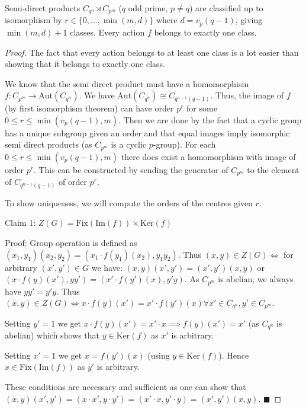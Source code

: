 \begin{theorem}\label{Classification of semi-direct products between Cyclic p-group and q-groups}
    Semi-direct products $C_{q^n} \rtimes C_{p^m}$ ($q$ odd prime, $p \neq q$) are classified up to isomorphism by $r \in \{0, …, \min(m, d)\}$ where $d = v_p(q - 1)$, giving $\min(m, d) + 1$ classes. Every action $f$ belongs to exactly one class.
\end{theorem}
\begin{proof}
    The fact that every action belongs to at least one class is a lot easier than showing that it belongs to exactly one class.

    We know that the semi direct product must have a homomorphism $f : C_{p^m} \rightarrow \text{Aut}(C_{q^n})$. We have $\text{Aut}(C_{q^n}) \cong C_{q^{n-1}(q - 1)}$. Thus, the image of $f$ (by first isomorphism theorem) can have order $p^r$ for some $0 \leq r \leq \min(v_p(q-1), m)$. Then we are done by the fact that a cyclic group has a unique subgroup given an order and that equal images imply isomorphic semi direct products (as $C_{p^m}$ is a cyclic $p$-group). For each $0 \leq r \leq \min(v_p(q-1), m)$ there does exist a homomorphism with image of order $p^r$. This can be constructed by sending the generator of $C_{p^m}$ to the element of $C_{q^{n-1}(q-1)}$ of order $p^r$.

    To show uniqueness, we will compute the orders of the centres given $r$.

    Claim 1: $Z(G) = \text{Fix}(\text{Im}(f)) \times \text{Ker}(f)$

    Proof: Group operation is defined as $(x_1, y_1)(x_2, y_2) = (x_1 \cdot f(y_1)(x_2), y_1y_2)$. Thus $(x, y) \in Z(G) \iff$ for arbitrary $(x', y') \in G$ we have: $(x, y)(x', y') = (x', y')(x, y)$ or $(x \cdot f(y)(x'), yy') = (x' \cdot f(y')(x), y'y)$. As $C_{p^m}$ is abelian, we always have $yy' = y'y$. Thus $(x, y) \in Z(G) \iff x \cdot f(y)(x') = x' \cdot f(y')(x) \forall x' \in C_{q^n}, y' \in C_{p^m}$. 
    
    Setting $y' = 1$ we get $x \cdot f(y)(x') = x' \cdot x \implies f(y)(x') = x'$ (as $C_{q^n}$ is abelian) which shows that $y \in \text{Ker}(f)$ as $x'$ is arbitrary.

    Setting $x' = 1$ we get $x = f(y')(x)$ (using $y \in \text{Ker}(f)$). Hence $x \in \text{Fix}(\text{Im}(f))$ as $y'$ is arbitrary.

    These conditions are necessary and sufficient as one can show that $(x, y)(x', y') = (x \cdot x', y \cdot y') = (x' \cdot x, y' \cdot y) = (x', y') (x, y)$. $\blacksquare$


\end{proof}
